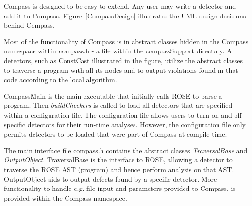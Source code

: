 Compass is designed to be easy to extend. Any user may write a detector and add it to Compass. Figure~\ref{CompassDesign}
illustrates the UML design decisions behind Compass.


Most of the functionality of Compass is in abstract classes hidden in the Compass namespace within compass.h - a file within
the compassSupport directory. All detectors, such as ConstCast illustrated in the figure, utilize the abstract classes
to traverse a program with all its nodes and to output violations found in that code according to the local algorithm.

CompassMain is the main executable that initially calls ROSE to parse a program. Then \emph{buildCheckers} is called to
load all detectors that are specified within a configuration file. The configuration file allows users to turn on and off
specific detectors for their run-time analyses. However, the configuration file only permits detectors to be loaded that 
were part of Compass at compile-time.

The main interface file compass.h contains the abstract classes \emph{TraversalBase} and 
\emph{OutputObject}. TraversalBase is the interface to ROSE, allowing a detector to traverse the ROSE AST (program) and hence
perform analysis on that AST. OutputObject aids to output defects found by a specific detector. More functionality to handle
e.g. file input and parameters provided to Compass, is provided within the Compass namespace.


